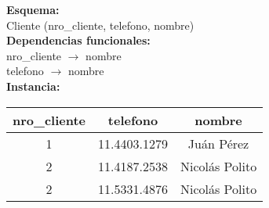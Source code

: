 \documentclass[preview]{standalone}
\begin{document}
\textbf{Esquema:}\\
Cliente (nro\_cliente, telefono, nombre)\\

\textbf{Dependencias funcionales:}\\
nro\_cliente $\rightarrow$ nombre\\
telefono $\rightarrow$ nombre\\

\textbf{Instancia:}\\
\begin{tabular}{ | c | c | c |}
  \hline			
  nro\_cliente & telefono & nombre \\
  \hline			
  1 & 11.4403.1279 & Ju\'an P\'erez \\
  2 & 11.4187.2538 & Nicol\'as Polito \\
  2 & 11.5331.4876 & Nicol\'as Polito \\
  \hline  
\end{tabular}
\end{document}
